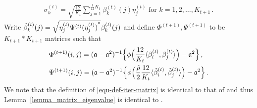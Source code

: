 \documentclass[11pt]{article}
\numberwithin{equation}{section}
\begin{document}
\begin{align}
    \sigma_k^{(t)}= \sqrt{\frac{12}{K_t}}   \sum_{j=1}^{\frac{1}{12}K_t} \beta^{(t)}_k(j)  \eta_j^{(t)} \mbox{ for } k=1,2,\ldots,K_{t+1}\,.
    \label{equ-def-sigma}
\end{align}
Write $\Hat{\beta}^{(t)}_k(j)= \sqrt{\eta^{(t)}_j \Psi^{(t)} {( \eta^{(t)}_j )}^{*}} \beta^{(t)}_k(j)$ and define $\Phi^{(t+1)},\Psi^{(t+1)}$ to be $K_{t+1}*K_{t+1}$ matrices such that
\begin{equation}
    \begin{aligned}
    & \Phi^{(t+1)}(i,j) = (\mathfrak{a}-\mathfrak{a}^2)^{-1} \Big\{  \phi \Big( \frac{12}{K_t} \langle {\beta}^{(t)}_i,{\beta}^{(t)}_j \rangle \Big) - \mathfrak{a}^2 \Big\}  \,,  \\
    & \Psi^{(t+1)}(i,j)= (\mathfrak{a}-\mathfrak{a}^2)^{-1} \Big\{ \phi \Big( \frac{\Hat{\rho}}{2} \frac{12}{K_t} \langle \Hat{\beta}^{(t)}_i , \Hat{\beta}^{(t)}_j \rangle \Big) - \mathfrak{a}^2    \Big\}\,.
    \label{equ-def-iter-matrix}
    \end{aligned}
\end{equation}
We note that the definition of \eqref{equ-def-iter-matrix} is identical to that of \cite[(2.15)]{DL22+} and thus Lemma~\ref{lemma_matrix_eigenvalue} is identical to \cite[Lemma 2.1]{DL22+}.
\end{document}
